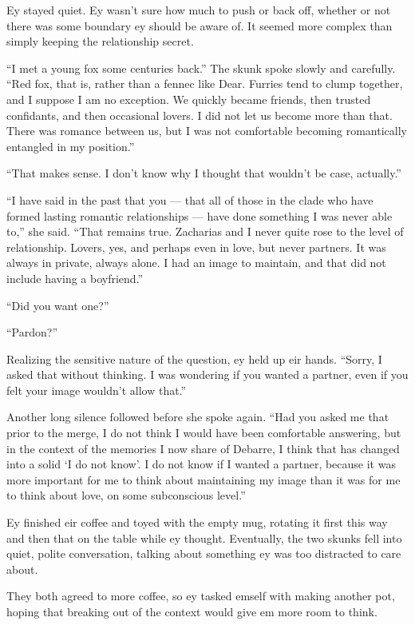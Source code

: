 Ey stayed quiet. Ey wasn't sure how much to push or back off, whether or not there was some boundary ey should be aware of. It seemed more complex than simply keeping the relationship secret.

``I met a young fox some centuries back.'' The skunk spoke slowly and carefully. ``Red fox, that is, rather than a fennec like Dear. Furries tend to clump together, and I suppose I am no exception. We quickly became friends, then trusted confidants, and then occasional lovers. I did not let us become more than that. There was romance between us, but I was not comfortable becoming romantically entangled in my position.''

``That makes sense. I don't know why I thought that wouldn't be case, actually.''

``I have said in the past that you — that all of those in the clade who have formed lasting romantic relationships — have done something I was never able to,'' she said. ``That remains true. Zacharias and I never quite rose to the level of relationship. Lovers, yes, and perhaps even in love, but never partners. It was always in private, always alone. I had an image to maintain, and that did not include having a boyfriend.''

``Did you want one?''

``Pardon?''

Realizing the sensitive nature of the question, ey held up eir hands. ``Sorry, I asked that without thinking. I was wondering if you wanted a partner, even if you felt your image wouldn't allow that.''

Another long silence followed before she spoke again. ``Had you asked me that prior to the merge, I do not think I would have been comfortable answering, but in the context of the memories I now share of Debarre, I think that has changed into a solid `I do not know'. I do not know if I wanted a partner, because it was more important for me to think about maintaining my image than it was for me to think about love, on some subconscious level.''

Ey finished eir coffee and toyed with the empty mug, rotating it first this way and then that on the table while ey thought. Eventually, the two skunks fell into quiet, polite conversation, talking about something ey was too distracted to care about.

They both agreed to more coffee, so ey tasked emself with making another pot, hoping that breaking out of the context would give em more room to think.

